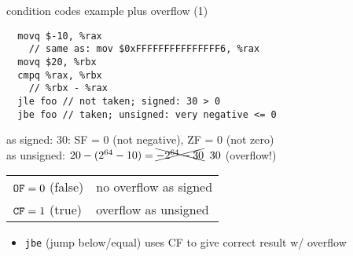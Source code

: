 \begin{frame}[fragile,label=ccEx1OF]{condition codes example plus overflow (1)}
\begin{lstlisting}
  movq $-10, %rax
    // same as: mov $0xFFFFFFFFFFFFFFF6, %rax
  movq $20, %rbx
  cmpq %rax, %rbx
    // %rbx - %rax
  jle foo // not taken; signed: 30 > 0
  jbe foo // taken; unsigned: very negative <= 0
\end{lstlisting}
as signed: 30: SF = 0 (not negative), ZF = 0 (not zero) \\
as unsigned: $20 - (2^{64} - 10) = \xcancel{-2^{64} - 30}\;\;30$ (overflow!) \\
\begin{tabular}{ll}
$\mathtt{OF} = 0$ (false) & no overflow as signed \\
$\mathtt{CF} = 1$ (true) & overflow as unsigned \\
\end{tabular}
\begin{itemize}
\item \texttt{jbe} (jump below/equal) uses CF to give correct result w/ overflow 
\end{itemize}
\end{frame}


